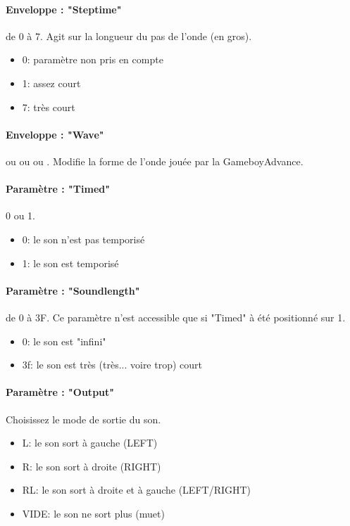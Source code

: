 \documentclass[12pt,a4paper]{article}
\begin{document}
            \paragraph{Enveloppe : "Steptime"} de 0 à 7. Agit sur la longueur du pas de l'onde (en gros).
            \begin{itemize}
                \item{0: paramètre non pris en compte}
                \item{1: assez court}
                \item{7: très court}
            \end{itemize}

            \paragraph{Enveloppe : "Wave"}  ou  ou  ou . Modifie la forme de l'onde jouée par la GameboyAdvance.

            \paragraph{Paramètre : "Timed"} 0 ou 1.
            \begin{itemize}
                \item{0: le son n'est pas temporisé}
                \item{1: le son est temporisé}
            \end{itemize}

            \paragraph{Paramètre : "Soundlength"} de 0 à 3F. Ce paramètre n'est accessible que si "Timed" à été positionné sur 1.
            \begin{itemize}
                \item{0: le son est "infini"}
                \item{3f: le son est très (très... voire trop) court}
            \end{itemize}

            \paragraph{Paramètre : "Output"} Choisissez le mode de sortie du son.
            \begin{itemize}
                \item{L: le son sort à gauche (LEFT)}
                \item{R: le son sort à droite (RIGHT)}
                \item{RL: le son sort à droite et à gauche (LEFT/RIGHT)}
                \item{VIDE: le son ne sort plus (muet)}
            \end{itemize}
\end{document}
